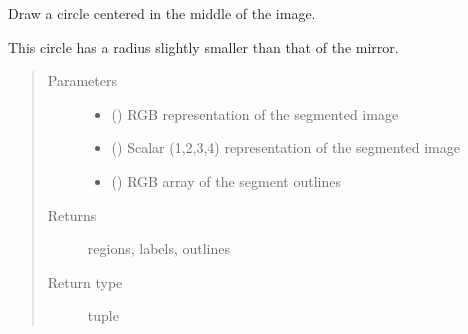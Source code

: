 \documentclass[letterpaper,10pt,english]{sphinxmanual}
\begin{document}
\begin{fulllineitems}
\label{\detokenize{createregions:createregions.large_circle}}
Draw a circle centered in the middle of the image.

This circle has a radius slightly smaller than that of the mirror.
\begin{quote}\begin{description}
\item[{Parameters}] \leavevmode\begin{itemize}
\item {} 
 () \textendash{} RGB representation of the segmented image

\item {} 
 () \textendash{} Scalar (1,2,3,4) representation of the segmented image

\item {} 
 () \textendash{} RGB array of the segment outlines

\end{itemize}

\item[{Returns}] \leavevmode
regions, labels, outlines

\item[{Return type}] \leavevmode
tuple

\end{description}\end{quote}

\end{fulllineitems}

\end{document}
